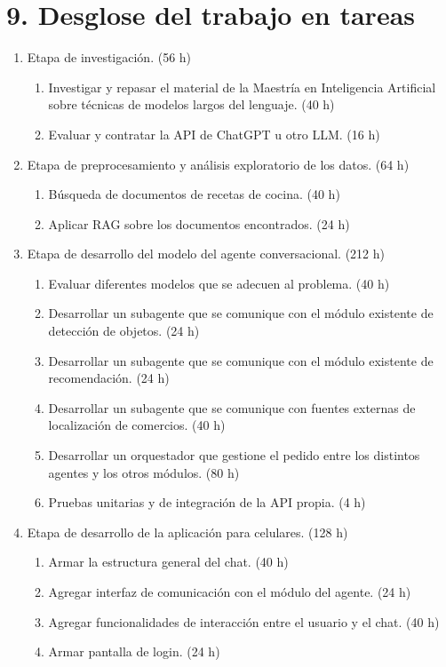 \documentclass[
11pt, %
]{charter}
\begin{document}
\section{9. Desglose del trabajo en tareas}
\label{sec:wbs}

\begin{enumerate}

\item Etapa de investigación. (56 h)
    \begin{enumerate}
        \item Investigar y repasar el material de la Maestría en Inteligencia Artificial sobre técnicas de modelos largos del lenguaje. (40 h)
        \item Evaluar y contratar la API de ChatGPT u otro LLM. (16 h)
    \end{enumerate}

\item Etapa de preprocesamiento y análisis exploratorio de los datos. (64 h)
    \begin{enumerate}
        \item Búsqueda de documentos de recetas de cocina. (40 h)
        \item Aplicar RAG sobre los documentos encontrados. (24 h)
    \end{enumerate}

\item Etapa de desarrollo del modelo del agente conversacional. (212 h)
    \begin{enumerate}
        \item Evaluar diferentes modelos que se adecuen al problema. (40 h)
        \item Desarrollar un subagente que se comunique con el módulo existente de detección de objetos. (24 h)
        \item Desarrollar un subagente que se comunique con el módulo existente de recomendación. (24 h)
        \item Desarrollar un subagente que se comunique con fuentes externas de localización de comercios. (40 h)
        \item Desarrollar un orquestador que gestione el pedido entre los distintos agentes y los otros módulos. (80 h)
        \item Pruebas unitarias y de integración de la API propia. (4 h)
    \end{enumerate}

\item Etapa de desarrollo de la aplicación para celulares. (128 h)
    \begin{enumerate}
        \item Armar la estructura general del chat. (40 h)
        \item Agregar interfaz de comunicación con el módulo del agente. (24 h)
        \item Agregar funcionalidades de interacción entre el usuario y el chat. (40 h)
        \item Armar pantalla de login. (24 h)
    \end{enumerate}


\end{enumerate}
\end{document}
